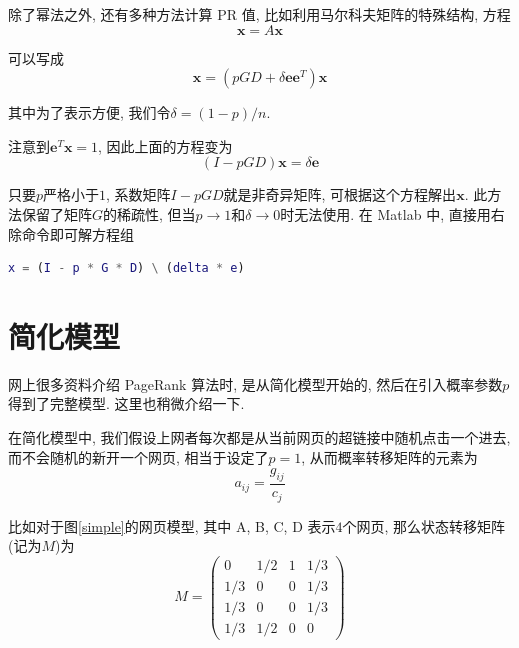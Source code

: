 \documentclass[a4paper,UTF8]{ctexart}
\theoremstyle{plain} \newtheorem{theorem}{定理}[section]
\theoremstyle{plain} \newtheorem{definition}{定义}[section]
\theoremstyle{plain} \newtheorem{lemma}{引理}[section]
\theoremstyle{plain} \newtheorem{proposition}{命题}[section]
\theoremstyle{plain} \newtheorem{example}{例}[section]
\theoremstyle{plain} \newtheorem{remark}{注}[section]
\theoremstyle{plain} \newtheorem{corollary}{推论}[section]
\begin{document}
除了幂法之外, 还有多种方法计算 PR 值, 比如利用马尔科夫矩阵的特殊结构, 方程
\begin{equation*}
\bm{x} = A \bm{x}
\end{equation*}

可以写成
\begin{equation*}
\bm{x} = (p G D + \delta \bm{e} \bm{e}^{T}) \bm{x}
\end{equation*}

其中为了表示方便, 我们令$\delta = (1 - p) / n$.

注意到$\bm{e}^{T} \bm{x} = 1$, 因此上面的方程变为
\begin{equation*}
(I - p G D) \bm{x} = \delta \bm{e}
\end{equation*}

只要$p$严格小于$1$, 系数矩阵$I - p G D$就是非奇异矩阵, 可根据这个方程解出$\bm{x}$. 此方法保留了矩阵$G$的稀疏性, 但当$p \rightarrow 1$和$\delta \rightarrow 0$时无法使用. 在 Matlab 中, 直接用右除命令即可解方程组
\begin{lstlisting}[language = matlab]
x = (I - p * G * D) \ (delta * e)
\end{lstlisting}


\section{简化模型}
网上很多资料介绍 PageRank 算法时, 是从简化模型开始的, 然后在引入概率参数$p$得到了完整模型. 这里也稍微介绍一下.

在简化模型中, 我们假设上网者每次都是从当前网页的超链接中随机点击一个进去, 而不会随机的新开一个网页, 相当于设定了$p = 1$, 从而概率转移矩阵的元素为
\begin{equation*}
a_{ij} = \frac{g_{ij}}{c_{j}}
\end{equation*}

比如对于图\ref{simple}的网页模型, 其中 A, B, C, D 表示$4$个网页, 那么状态转移矩阵(记为$M$)为
$$
M = 
\begin{pmatrix}
0  &  1 / 2  &  1  &  1 / 3 \\ 
1 / 3  &  0  &  0  &  1 / 3 \\ 
1 / 3  &  0  &  0  &  1 / 3 \\ 
1 / 3  &  1 / 2  &  0  &  0
\end{pmatrix}
$$
\end{document}
